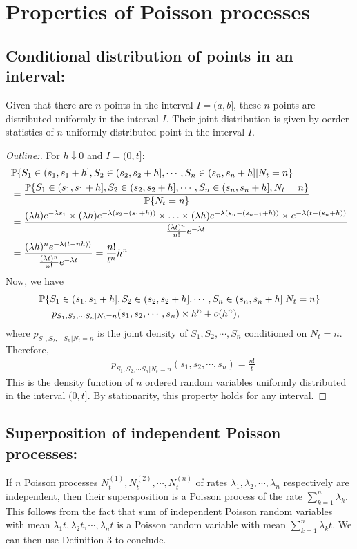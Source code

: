 \documentclass[a4paper,10pt,english]{article}
\begin{document}
\section{Properties of Poisson processes}
\subsection*{Conditional distribution of points in an interval:} Given that there are $n$ points in the interval $I = (a,b]$, these $n$ points are distributed uniformly in the interval $I$. Their joint distribution is given by oerder statistics of $n$ uniformly distributed point in the interval $I$.
\begin{proof}[Outline:]
For $h \downarrow 0$ and $I = (0,t]$:
\begin{align*}
&\P\{S_1\in (s_1,s_1+h],S_2\in (s_2,s_2+h],\cdots,S_n\in (s_n,s_n+h] |N_t = n\}  \\
&= \frac{\P\{S_1\in (s_1,s_1+h],S_2\in (s_2,s_2+h],\cdots,S_n\in (s_n,s_n+h],N_t=n\}}{\P\{N_t=n\}}  \\
 &= \frac{ (\lambda h)e^{-\lambda s_1} \times (\lambda h)e^{-\lambda (s_2-(s_1+h))} \times \ldots \times (\lambda h)e^{-\lambda (s_n-(s_{n-1}+h))} \times e^{-\lambda (t-(s_n+h))} }{ \frac{(\lambda t)^n }{n!} e^{-\lambda t} }\\
 &= \frac{ (\lambda h)^n e^{-\lambda(t-nh))}}{ \frac{(\lambda t)^n }{n!} e^{-\lambda t} } = \frac{n!}{t^n} h^n
\end{align*}
Now, we have 
\begin{align*}
&\P\{S_1\in (s_1,s_1+h],S_2\in (s_2,s_2+h],\cdots,S_n\in (s_n,s_n+h] |N_t = n\} \\
&= p_{S_1,S_2,\cdots S_n | N_t=n}(s_1,s_2,\cdots,s_n) \times h^n + o(h^n),
\end{align*}
where $p_{S_1,S_2,\cdots S_n | N_t=n}$ is the joint density of $S_1,S_2,\cdots,S_n$ conditioned on $N_t=n$. Therefore, 
\begin{align*}
&p_{S_1,S_2,\cdots S_n | N_t=n}(s_1,s_2,\cdots,s_n) = \frac{n!}{t}
\end{align*}
This is the density function of $n$ ordered random variables uniformly distributed in the interval $(0,t]$. By stationarity, this property holds for any interval. \qedhere
\end{proof}
\subsection*{Superposition of independent Poisson processes:}
If $n$ Poisson processes $N_t^{(1)},N_t^{(2)},\cdots,N_t^{(n)}$ of rates $\lambda_1,\lambda_2,\cdots,\lambda_n$ respectively are independent, then their supersposition is a Poisson process of the rate $\sum_{k=1}^n \lambda_k$. This follows from the fact that sum of independent Poisson random variables with mean $\lambda_1 t, \lambda_2 t, \cdots , \lambda_n t$ is a Poisson random variable with mean $\sum_{k=1}^n \lambda_k t$. We can then use Definition $3$ to conclude.
\end{document}
